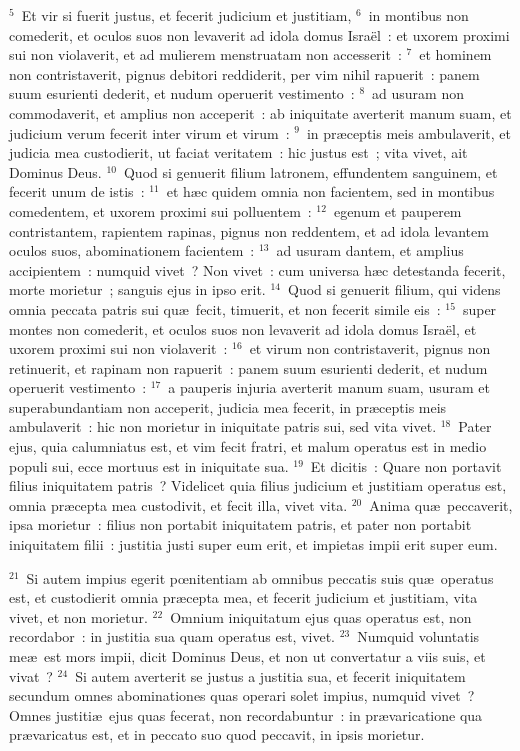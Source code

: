 ${}^{5}$~Et vir si fuerit justus, et fecerit judicium et justitiam,
${}^{6}$~in montibus non comederit, et oculos suos non levaverit ad idola domus Isra\"el~: et uxorem proximi sui non violaverit, et ad mulierem menstruatam non accesserit~:
${}^{7}$~et hominem non contristaverit, pignus debitori reddiderit, per vim nihil rapuerit~: panem suum esurienti dederit, et nudum operuerit vestimento~:
${}^{8}$~ad usuram non commodaverit, et amplius non acceperit~: ab iniquitate averterit manum suam, et judicium verum fecerit inter virum et virum~:
${}^{9}$~in pr\ae ceptis meis ambulaverit, et judicia mea custodierit, ut faciat veritatem~: hic justus est~; vita vivet, ait Dominus Deus.
${}^{10}$~Quod si genuerit filium latronem, effundentem sanguinem, et fecerit unum de istis~:
${}^{11}$~et h\ae c quidem omnia non facientem, sed in montibus comedentem, et uxorem proximi sui polluentem~:
${}^{12}$~egenum et pauperem contristantem, rapientem rapinas, pignus non reddentem, et ad idola levantem oculos suos, abominationem facientem~:
${}^{13}$~ad usuram dantem, et amplius accipientem~: numquid vivet~? Non vivet~: cum universa h\ae c detestanda fecerit, morte morietur~; sanguis ejus in ipso erit.
${}^{14}$~Quod si genuerit filium, qui videns omnia peccata patris sui qu\ae\ fecit, timuerit, et non fecerit simile eis~:
${}^{15}$~super montes non comederit, et oculos suos non levaverit ad idola domus Isra\"el, et uxorem proximi sui non violaverit~:
${}^{16}$~et virum non contristaverit, pignus non retinuerit, et rapinam non rapuerit~: panem suum esurienti dederit, et nudum operuerit vestimento~:
${}^{17}$~a pauperis injuria averterit manum suam, usuram et superabundantiam non acceperit, judicia mea fecerit, in pr\ae ceptis meis ambulaverit~: hic non morietur in iniquitate patris sui, sed vita vivet.
${}^{18}$~Pater ejus, quia calumniatus est, et vim fecit fratri, et malum operatus est in medio populi sui, ecce mortuus est in iniquitate sua.
${}^{19}$~Et dicitis~: Quare non portavit filius iniquitatem patris~? Videlicet quia filius judicium et justitiam operatus est, omnia pr\ae cepta mea custodivit, et fecit illa, vivet vita.
${}^{20}$~Anima qu\ae\ peccaverit, ipsa morietur~: filius non portabit iniquitatem patris, et pater non portabit iniquitatem filii~: justitia justi super eum erit, et impietas impii erit super eum.


${}^{21}$~Si autem impius egerit pœnitentiam ab omnibus peccatis suis qu\ae\ operatus est, et custodierit omnia pr\ae cepta mea, et fecerit judicium et justitiam, vita vivet, et non morietur.
${}^{22}$~Omnium iniquitatum ejus quas operatus est, non recordabor~: in justitia sua quam operatus est, vivet.
${}^{23}$~Numquid voluntatis me\ae\ est mors impii, dicit Dominus Deus, et non ut convertatur a viis suis, et vivat~?
${}^{24}$~Si autem averterit se justus a justitia sua, et fecerit iniquitatem secundum omnes abominationes quas operari solet impius, numquid vivet~? Omnes justiti\ae\ ejus quas fecerat, non recordabuntur~: in pr\ae varicatione qua pr\ae varicatus est, et in peccato suo quod peccavit, in ipsis morietur.



